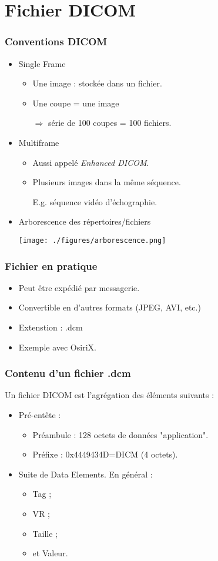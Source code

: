 \section{Fichier DICOM}

\frame
{
	\frametitle{Conventions DICOM}
	\begin{itemize}
		\item Single Frame
		\begin{itemize}
			\item Une image : stock\'ee dans un fichier.
			\item Une coupe = une image
		
			$\Rightarrow$ s\'erie de 100 coupes = 100 fichiers.
		\end{itemize}
		\item Multiframe
		\begin{itemize}
			\item Aussi appel\'e \emph{Enhanced DICOM}.
			\item Plusieurs images dans la m\^eme s\'equence.
			
			E.g. s\'equence vid\'eo d'\'echographie.
		\end{itemize}
		\item Arborescence des r\'epertoires/fichiers
		\begin{center}
			\texttt{[image: ./figures/arborescence.png]}
		\end{center}

	\end{itemize}
}

\frame
{
	\frametitle{Fichier en pratique}
	
	\begin{itemize}
		\item Peut \^etre exp\'edi\'e par messagerie.
		\item Convertible en d'autres formats (JPEG, AVI, etc.)
		\item Extenstion : .dcm
		\item Exemple avec OsiriX.
	\end{itemize}
}

\frame
{
	\frametitle{Contenu d'un fichier .dcm}
	
	Un fichier DICOM est l'agr\'egation des \'el\'ements suivants :
	\begin{itemize}
		\item Pr\'e-ent\^ete :
		\begin{itemize}
			\item Pr\'eambule : 128 octets de donn\'ees "application".
			\item Pr\'efixe : 0x4449434D=DICM (4 octets).
		\end{itemize}
		\item Suite de Data Elements.
		En g\'en\'eral :
		\begin{itemize}
			\item Tag ;
			\item VR ;
			\item Taille ;
			\item et Valeur.
		\end{itemize}
	\end{itemize}
}
